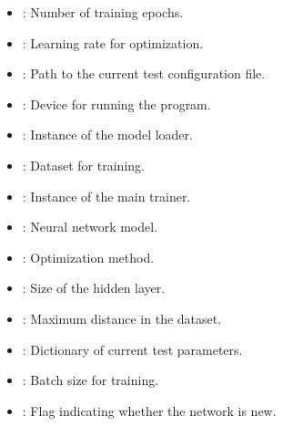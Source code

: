 \documentclass[letterpaper,10pt,english]{sphinxmanual}
\begin{document}
\begin{fulllineitems}
\begin{description}
\begin{itemize}
\item {} 
\sphinxAtStartPar
{}: Number of training epochs.

\item {} 
\sphinxAtStartPar
{}: Learning rate for optimization.

\item {} 
\sphinxAtStartPar
{}: Path to the current test configuration file.

\item {} 
\sphinxAtStartPar
{}: Device for running the program.

\item {} 
\sphinxAtStartPar
{}: Instance of the model loader.

\item {} 
\sphinxAtStartPar
{}: Dataset for training.

\item {} 
\sphinxAtStartPar
{}: Instance of the main trainer.

\item {} 
\sphinxAtStartPar
{}: Neural network model.

\item {} 
\sphinxAtStartPar
{}: Optimization method.

\item {} 
\sphinxAtStartPar
{}: Size of the hidden layer.

\item {} 
\sphinxAtStartPar
{}: Maximum distance in the dataset.

\item {} 
\sphinxAtStartPar
{}: Dictionary of current test parameters.

\item {} 
\sphinxAtStartPar
{}: Batch size for training.

\item {} 
\sphinxAtStartPar
{}: Flag indicating whether the network is new.

\end{itemize}


\end{description}
\end{fulllineitems}
\end{document}
